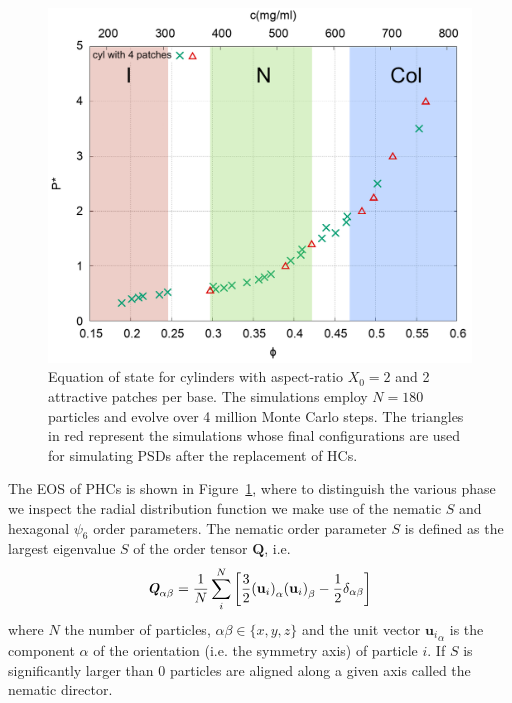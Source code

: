 \documentclass[aip,jcp, amsmath, amssymb, reprint]{revtex4-1}
\begin{document}
\begin{figure}[h!]
\includegraphics[width=0.86\linewidth]{eos.png}
\caption{\label{fig:eos1} Equation of state for cylinders with aspect-ratio $X_0=2$ and 2 attractive patches per base. The simulations employ $N = 180$ particles and evolve over 4 million Monte Carlo steps. The triangles in red represent the simulations whose final configurations are used for simulating PSDs after the replacement of HCs.}
\end{figure}

The EOS of PHCs is shown in Figure~\ref{fig:eos1}, where to distinguish the various phase we inspect the radial distribution function we make use of the 
nematic $S$ and hexagonal $\psi_6$ order parameters.
The nematic order parameter $S$ is defined as the largest eigenvalue $S$ of the order tensor $\mathbf{Q}$, i.e.
\begin{equation} 
\label{tensornematic} 
\textit{\textbf{Q}}_{\alpha \beta}=\frac{1}{N}\sum_i^{N} 
\bigg[\frac{3}{2} {(\mathbf{u}_i)}_{\alpha} {(\mathbf{u}_i)}_{\beta} - \frac{1}{2} \delta_{\alpha\beta} \bigg]
\end{equation}
where $N$ the number of particles, $\alpha\beta \in\{x,y,z\}$ and the unit vector
${\mathbf{u}_i}_\alpha$ is the component $\alpha$ of the orientation (i.e. the symmetry axis) of particle $i$.
If $S$ is significantly larger than $0$ particles are aligned along a given axis called the nematic director.
\end{document}
